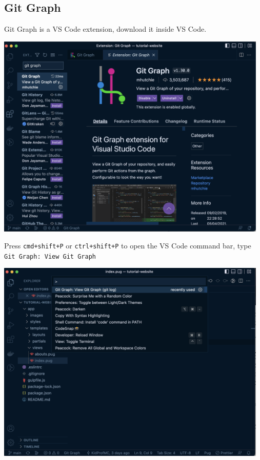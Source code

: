 \subsection*{Git Graph}

Git Graph is a VS Code extension, download it inside VS Code.

\begin{center}
\includegraphics[width=13cm]{images/ch3-gitgraph0.png}
\end{center}

Press \texttt{cmd+shift+P} or \texttt{ctrl+shift+P} to open the VS Code command bar, type \texttt{Git Graph: View Git Graph}

\begin{center}
\includegraphics[width=13cm]{images/ch3-gitgraph1.png}
\end{center}

